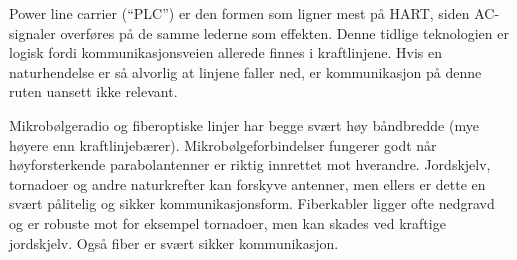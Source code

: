 





Power line carrier (``PLC'') er den formen som ligner mest på HART, siden AC-signaler overføres på de samme lederne som effekten. Denne tidlige teknologien er logisk fordi kommunikasjonsveien allerede finnes i kraftlinjene. Hvis en naturhendelse er så alvorlig at linjene faller ned, er kommunikasjon på denne ruten uansett ikke relevant.

\vskip 10pt

Mikrobølgeradio og fiberoptiske linjer har begge svært høy båndbredde (mye høyere enn kraftlinjebærer). Mikrobølgeforbindelser fungerer godt når høyforsterkende parabolantenner er riktig innrettet mot hverandre. Jordskjelv, tornadoer og andre naturkrefter kan forskyve antenner, men ellers er dette en svært pålitelig og sikker kommunikasjonsform. Fiberkabler ligger ofte nedgravd og er robuste mot for eksempel tornadoer, men kan skades ved kraftige jordskjelv. Også fiber er svært sikker kommunikasjon.









